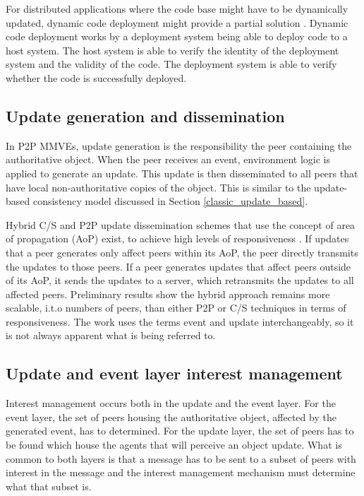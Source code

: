 For distributed applications where the code base might have to be dynamically updated, dynamic code deployment might provide a partial solution \cite{dynamic_code_deployment_patent}. Dynamic code deployment works by a deployment system being able to deploy code to a host system. The host system is able to verify the identity of the deployment system and the validity of the code. The deployment system is able to verify whether the code is successfully deployed.

\subsection{Update generation and dissemination}

In P2P MMVEs, update generation is the responsibility the peer containing the authoritative object. When the peer receives an event, environment logic is applied to generate an update. This update is then disseminated to all peers that have local non-authoritative copies of the object. This is similar to the update-based consistency model discussed in Section \ref{classic_update_based}.

Hybrid C/S and P2P update dissemination schemes that use the concept of area of propagation (AoP) exist, to achieve high levels of responsiveness \cite{AoP_event_dissemination}. If updates that a peer generates only affect peers within its AoP, the peer directly transmits the updates to those peers. If a peer generates updates that affect peers outside of its AoP, it sends the updates to a server, which retransmits the updates to all affected peers. Preliminary results show the hybrid approach remains more scalable, i.t.o numbers of peers, than either P2P or C/S techniques in terms of responsiveness. The work uses the terms event and update interchangeably, so it is not always apparent what is being referred to.

\subsection{Update and event layer interest management}
\label{key_challenges_im}

Interest management occurs both in the update and the event layer. For the event layer, the set of peers housing the authoritative object, affected by the generated event, has to determined. For the update layer, the set of peers has to be found which house the agents that will perceive an object update. What is common to both layers is that a message has to be sent to a subset of peers with interest in the message and the interest management mechanism must determine what that subset is.


